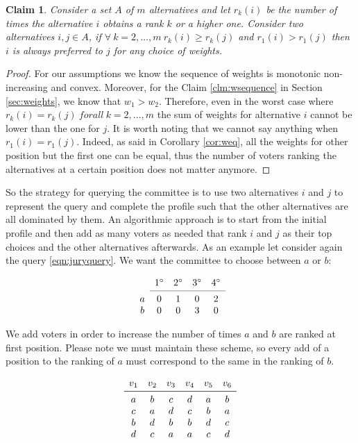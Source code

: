 \documentclass[12pt]{article}
\newtheorem{claim}{Claim}
\begin{document}
\begin{claim}
	Consider a set $A$ of $m$ alternatives and let $r_k(i)$ be the number of times the alternative $i$ obtains a rank $k$ or a higher one. Consider two alternatives $ i,j \in A$, if $\forall \ k=2, \dots,m \ r_k(i)\geq r_k(j)$ and $r_1(i) > r_1(j)$ then $i$ is always preferred to $j$ for any choice of weights.
\end{claim}

\begin{proof}
	For our assumptions we know the sequence of weights is monotonic non-increasing and convex. Moreover, for the Claim \ref{clm:wsequence} in Section \ref{sec:weights}, we know that $w_1 > w_2$. Therefore, even in the worst case where $r_k(i) = r_k(j) \ forall \ k=2, \dots,m$ the sum of weights for alternative $i$ cannot be lower than the one for $j$. It is worth noting that we cannot say anything when $r_1(i) = r_1(j)$. Indeed, as said in Corollary \ref{cor:weq}, all the weights for other position but the first one can be equal, thus the number of voters ranking the alternatives at a certain position does not matter anymore.	
\end{proof}

So the strategy for querying the committee is to use two alternatives $i$ and $j$ to represent the query and complete the profile such that the other alternatives are all dominated by them. An algorithmic approach is to start from the initial profile and then add as many voters as needed that rank $i$ and $j$ as their top choices and the other alternatives afterwards. As an example let consider again the query \ref*{eqn:juryquery}. We want the committee to choose between $a$ or $b$:

\[
\begin{array}{ccccc}
& 1^\circ
& 2^\circ
& 3^\circ
& 4^\circ \\
\cmidrule{2-5}
a 
& 0
& 1
& 0
& 2 \\
b
& 0
& 0
& 3
& 0 \\
\end{array}
\]

We add voters in order to increase the number of times $a$ and $b$ are ranked at first position. Please note we must maintain these scheme, so every add of a position to the ranking of $a$ must correspond to the same in the ranking of $b$.

\[
\begin{array}{cccccc}
v_1
& v_2
& v_3 
& v_4
& v_5
& v_6 \\
\midrule 
a
& b
& c 
& d
& a
& b \\
c
& a
& d
& c
& b
& a \\
b
& d
& b
& b
& d
& c \\
d
& c
& a
& a
& c
& d \\
\end{array}
\]
\end{document}
